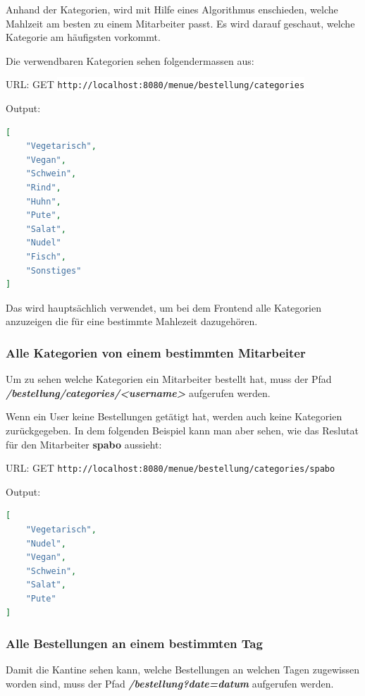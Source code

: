 Anhand der Kategorien, wird mit Hilfe eines Algorithmus enschieden, welche Mahlzeit am besten zu einem Mitarbeiter passt. Es wird darauf geschaut, welche Kategorie
am häufigsten vorkommt.

Die verwendbaren Kategorien sehen folgendermassen aus:

URL: GET \colorbox{white}{\lstinline[basicstyle=\ttfamily\color{black},language=html]|http://localhost:8080/menue/bestellung/categories|}

Output:

\begin{lstlisting}[language=json,firstnumber=1]
[
    "Vegetarisch",
    "Vegan",
    "Schwein",
    "Rind",
    "Huhn",
    "Pute",
    "Salat",
    "Nudel"
    "Fisch",
    "Sonstiges"
]
\end{lstlisting}

Das wird hauptsächlich verwendet, um bei dem Frontend alle Kategorien anzuzeigen die für eine bestimmte Mahlezeit dazugehören.

\pagebreak

\subsubsection{Alle Kategorien von einem bestimmten Mitarbeiter}

Um zu sehen welche Kategorien ein Mitarbeiter bestellt hat, muss der Pfad \textbf{\textit{/bestellung/categories/<username>}} aufgerufen werden.

Wenn ein User keine Bestellungen getätigt hat, werden auch keine Kategorien zurückgegeben. In dem folgenden Beispiel kann man aber sehen, wie das Reslutat
für den Mitarbeiter \textbf{spabo} aussieht:

URL: GET \colorbox{white}{\lstinline[basicstyle=\ttfamily\color{black},language=html]|http://localhost:8080/menue/bestellung/categories/spabo|}

Output:

\begin{lstlisting}[language=json,firstnumber=1]
[
    "Vegetarisch",
    "Nudel",
    "Vegan",
    "Schwein",
    "Salat",
    "Pute"
]
\end{lstlisting}

\subsubsection{Alle Bestellungen an einem bestimmten Tag}

Damit die Kantine sehen kann, welche Bestellungen an welchen Tagen zugewissen worden sind, muss der Pfad \textbf{\textit{/bestellung?date=datum}} aufgerufen werden.

